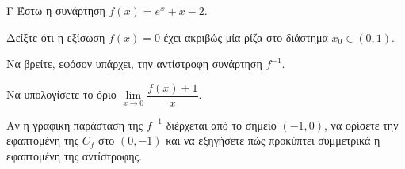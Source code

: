 \begin{thema}{Γ}
Έστω η συνάρτηση $f(x) = e^x + x - 2$.
\begin{erwthma}
  \item Δείξτε ότι η εξίσωση $f(x) = 0$ έχει ακριβώς μία ρίζα στο διάστημα $x_0\in(0, 1)$.
  \item Να βρείτε, εφόσον υπάρχει, την αντίστροφη συνάρτηση $f^{-1}$.
  \item Να υπολογίσετε το όριο $\lim\limits_{x \to 0} \dfrac{f(x) + 1}{x}$.
  \item Αν η γραφική παράσταση της $f^{-1}$ διέρχεται από το σημείο $(-1, 0)$, να ορίσετε την εφαπτομένη της $C_f$ στο $(0, -1)$ και να εξηγήσετε πώς προκύπτει συμμετρικά η εφαπτομένη της αντίστροφης.
\end{erwthma}
\end{thema}

